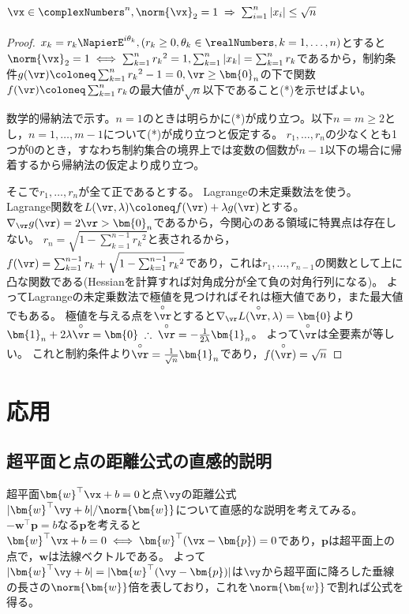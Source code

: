         \subsection{\texorpdfstring{$\vx\in\complexNumbers^n,\norm{\vx}_2=1\;\Rightarrow\;\sum_{i=1}^n{|x_i|}\leq\sqrt{n}$}{x∈C\string^n, ||x||\_2=1, ⇒ |x\_1|+...+|x\_n| ≤ √n}}
            \label{th:単位球面上の点の座標の絶対値の総和の最大値}
            \begin{proof}
                $x_k = r_k \NapierE^{i\theta_k}, (r_k \geq 0, \theta_k \in \realNumbers,k=1,\dotsc,n)$とすると$\norm{\vx}_2=1 \iff \sum_{k=1}^n {r_k}^2 = 1,\sum_{k=1}^n{|x_k|} = \sum_{k=1}^n r_k$であるから，制約条件$g(\vr) \coloneq \sum_{k=1}^n {r_k}^2 - 1 = 0,\vr \geq \bm{0}_n$の下で関数$f(\vr) \coloneq \sum_{k=1}^n r_k$の最大値が$\sqrt{n}$以下であること(*)を示せばよい。
                \par
                数学的帰納法で示す。$n=1$のときは明らかに(*)が成り立つ。以下$n=m\geq2$とし，$n=1,\dotsc,m-1$について(*)が成り立つと仮定する。
                $r_1,\dotsc,r_n$の少なくとも1つが0のとき，すなわち制約集合の境界上では変数の個数が$n-1$以下の場合に帰着するから帰納法の仮定より成り立つ。
                \par
                そこで$r_1,\dotsc,r_n$が全て正であるとする。
                Lagrangeの未定乗数法を使う。
                Lagrange関数を$L(\vr,\lambda)\coloneq f(\vr)+\lambda g(\vr)$とする。
                $\nabla_\vr g(\vr) = 2\vr > \bm{0}_n$であるから，今関心のある領域に特異点は存在しない。
                $r_n = \sqrt{1 - \sum_{k=1}^{n-1} {r_k}^2}$と表されるから，$f(\vr) = \sum_{k=1}^{n-1} r_k + \sqrt{1 - \sum_{k=1}^{n-1} {r_k}^2}$であり，これは$r_1,\dotsc,r_{n-1}$の関数として上に凸な関数である(Hessianを計算すれば対角成分が全て負の対角行列になる)。
                よってLagrangeの未定乗数法で極値を見つければそれは極大値であり，また最大値でもある。
                極値を与える点を$\overset{\circ}{\vr}$とすると$\nabla_{\vr}L(\overset{\circ}{\vr},\lambda)=\bm{0}$より$\bm{1}_n + 2\lambda\overset{\circ}{\vr}=\bm{0}\;\therefore\;\overset{\circ}{\vr}=-\frac{1}{2\lambda}\bm{1}_n$。
                よって$\overset{\circ}{\vr}$は全要素が等しい。
                これと制約条件より$\overset{\circ}{\vr} = \frac{1}{\sqrt{n}}\bm{1}_n$であり，$f(\overset{\circ}{\vr}) = \sqrt{n}$
            \end{proof}
    \section{応用}
        \subsection{超平面と点の距離公式の直感的説明}
            超平面$\bm{w}^\top\vx+b=0$と点$\vy$の距離公式$|\bm{w}^\top\vy+b|/\norm{\bm{w}}$について直感的な説明を考えてみる。
            $-\bm{w}^\top\bm{p} = b$なる$\bm{p}$を考えると$\bm{w}^\top\vx+b=0 \iff \bm{w}^\top(\vx-\bm{p})=0$であり，$\bm{p}$は超平面上の点で，$\bm{w}$は法線ベクトルである。
            よって$|\bm{w}^\top\vy+b| = |\bm{w}^\top(\vy-\bm{p})|$は$\vy$から超平面に降ろした垂線の長さの$\norm{\bm{w}}$倍を表しており，これを$\norm{\bm{w}}$で割れば公式を得る。